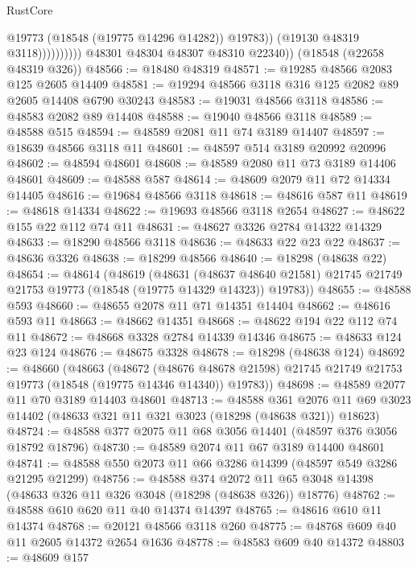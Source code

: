 \begin{lexlean}{RustCore}
\begin{coremodule}
                              @19773
                              (@18548 (@19775 @14296 @14282))
                              @19783))
                          (@19130 @48319 @3118))))))))))
        @48301
        @48304
        @48307
        @48310
        @22340))
    (@18548 (@22658 @48319 @326))
@48566 := @18480 @48319
@48571 := @19285 @48566 @2083 @125 @2605 @14409
@48581 := @19294 @48566 @3118 @316 @125 @2082 @89 @2605 @14408 @6790 @30243
@48583 := @19031 @48566 @3118
@48586 := @48583 @2082 @89 @14408
@48588 := @19040 @48566 @3118
@48589 := @48588 @515
@48594 := @48589 @2081 @11 @74 @3189 @14407
@48597 := @18639 @48566 @3118 @11
@48601 := @48597 @514 @3189 @20992 @20996
@48602 := @48594 @48601
@48608 := @48589 @2080 @11 @73 @3189 @14406 @48601
@48609 := @48588 @587
@48614 := @48609 @2079 @11 @72 @14334 @14405
@48616 := @19684 @48566 @3118
@48618 := @48616 @587 @11
@48619 := @48618 @14334
@48622 := @19693 @48566 @3118 @2654
@48627 := @48622 @155 @22 @112 @74 @11
@48631 := @48627 @3326 @2784 @14322 @14329
@48633 := @18290 @48566 @3118
@48636 := @48633 @22 @23 @22
@48637 := @48636 @3326
@48638 := @18299 @48566
@48640 := @18298 (@48638 @22)
@48654 := @48614
    (@48619
      (@48631
        (@48637 @48640 @21581)
        @21745
        @21749
        @21753
        @19773
        (@18548 (@19775 @14329 @14323))
        @19783))
@48655 := @48588 @593
@48660 := @48655 @2078 @11 @71 @14351 @14404
@48662 := @48616 @593 @11
@48663 := @48662 @14351
@48668 := @48622 @194 @22 @112 @74 @11
@48672 := @48668 @3328 @2784 @14339 @14346
@48675 := @48633 @124 @23 @124
@48676 := @48675 @3328
@48678 := @18298 (@48638 @124)
@48692 := @48660
    (@48663
      (@48672
        (@48676 @48678 @21598)
        @21745
        @21749
        @21753
        @19773
        (@18548 (@19775 @14346 @14340))
        @19783))
@48698 := @48589 @2077 @11 @70 @3189 @14403 @48601
@48713 := @48588
    @361
    @2076
    @11
    @69
    @3023
    @14402
    (@48633 @321 @11 @321 @3023 (@18298 (@48638 @321)) @18623)
@48724 := @48588 @377 @2075 @11 @68 @3056 @14401 (@48597 @376 @3056 @18792 @18796)
@48730 := @48589 @2074 @11 @67 @3189 @14400 @48601
@48741 := @48588 @550 @2073 @11 @66 @3286 @14399 (@48597 @549 @3286 @21295 @21299)
@48756 := @48588
    @374
    @2072
    @11
    @65
    @3048
    @14398
    (@48633 @326 @11 @326 @3048 (@18298 (@48638 @326)) @18776)
@48762 := @48588 @610 @620 @11 @40 @14374 @14397
@48765 := @48616 @610 @11 @14374
@48768 := @20121 @48566 @3118 @260
@48775 := @48768 @609 @40 @11 @2605 @14372 @2654 @1636
@48778 := @48583 @609 @40 @14372
@48803 := @48609
    @157

\end{coremodule}
\end{lexlean}
